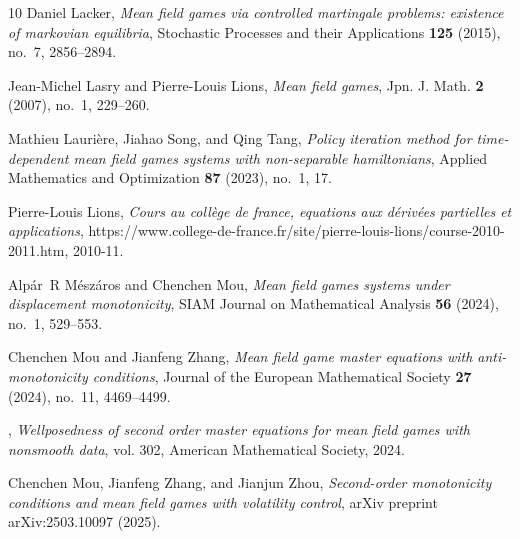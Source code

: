 \documentclass[11pt,a4paper]{amsart}
\theoremstyle{definition}
\begin{document}
\begin{thebibliography}{10}
	Daniel Lacker, \emph{Mean field games via controlled martingale problems:
		existence of markovian equilibria}, Stochastic Processes and their
	Applications \textbf{125} (2015), no.~7, 2856--2894.
	
	Jean-Michel Lasry and Pierre-Louis Lions, \emph{Mean field games}, Jpn. J.
	Math. \textbf{2} (2007), no.~1, 229--260. 
	
	Mathieu Laurière, Jiahao Song, and Qing Tang, \emph{Policy iteration method
		for time-dependent mean field games systems with non-separable hamiltonians},
	Applied Mathematics and Optimization \textbf{87} (2023), no.~1, 17.
	
	Pierre-Louis Lions, \emph{Cours au coll\`ege de france, equations aux
		d\'eriv\'ees partielles et applications},
	https://www.college-de-france.fr/site/pierre-louis-lions/course-2010-2011.htm,
	2010-11.
	
	Alp{\'a}r~R M{\'e}sz{\'a}ros and Chenchen Mou, \emph{Mean field games systems
		under displacement monotonicity}, SIAM Journal on Mathematical Analysis
	\textbf{56} (2024), no.~1, 529--553.
	
	Chenchen Mou and Jianfeng Zhang, \emph{Mean field game master equations with
		anti-monotonicity conditions}, Journal of the European Mathematical Society
	\textbf{27} (2024), no.~11, 4469--4499.
	
	\bysame, \emph{Wellposedness of second order master equations for mean field
		games with nonsmooth data}, vol. 302, American Mathematical Society, 2024.
	
	Chenchen Mou, Jianfeng Zhang, and Jianjun Zhou, \emph{Second-order monotonicity
		conditions and mean field games with volatility control}, arXiv preprint
	arXiv:2503.10097 (2025).
	
\end{thebibliography}
\end{document}
